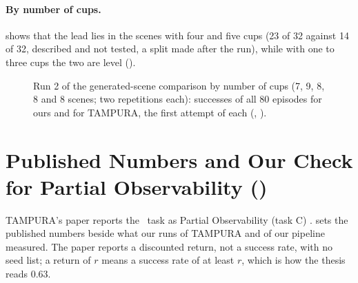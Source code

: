 \paragraph{By number of cups.}  shows that the lead lies in the
scenes with four and five cups (23 of 32 against 14 of 32, described and not
tested, a split made after the run), while with one to three cups the two are
level ().

\begin{figure}[tbp]
\centering
{}
\caption[Run 2 of the generated-scene comparison by number of cups.]{Run 2 of the
generated-scene comparison by number of cups (7, 9, 8, 8
and 8 scenes; two repetitions each): successes of all 80 episodes for ours and for
TAMPURA, the first attempt of each (,
). }
\label{fig:cups}
\end{figure}

\section{Published Numbers and Our Check for Partial Observability (\fdice)}
\label{sec:published-fd}

TAMPURA's paper reports the \fdice\ task as Partial Observability (task C)
\cite{curtis2024partially}.  sets the published numbers
beside what our runs of TAMPURA and of our pipeline measured. The paper reports a
discounted return, not a success rate, with no seed list; a return of $r$ means a
success rate of at least $r$, which is how the thesis reads 0.63.

